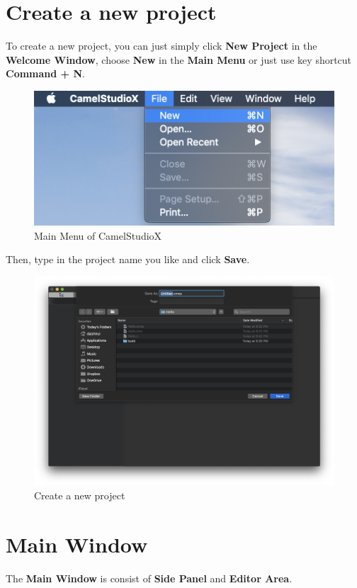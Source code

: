 \documentclass{article}
\begin{document}
	\section{Create a new project}
	
	To create a new project, you can just simply click \textbf{New Project} in the \textbf{Welcome Window}, choose \textbf{New} in the \textbf{Main Menu} or just use key shortcut \textbf{Command + N}.

	\begin{figure}[h]
		\centering
		\includegraphics[width=.8\textwidth]{MainMenu}
		\caption{Main Menu of CamelStudioX}
	\end{figure}
		
	\newpage
	Then, type in the project name you like and click \textbf{Save}.
		
	\begin{figure}[!h]
		\centering
		\includegraphics[width=.8\textwidth]{CreateProject}
		\caption{Create a new project}
	\end{figure}
		
	\section{Main Window}
		
	The \textbf{Main Window} is consist of \textbf{Side Panel} and \textbf{Editor Area}.
		
\end{document}
